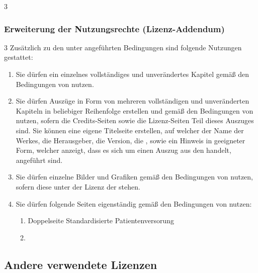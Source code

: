 \begin{WidePar}
\begin{multicols}{3}
\begin{description}
  
\end{description}
\end{multicols}
\subsubsection{Erweiterung der Nutzungsrechte
(Lizenz-Addendum)}
\label{topic:lizenz-addendum}
\begin{multicols}{3}
Zusätzlich zu den unter  angeführten
Bedingungen sind folgende Nutzungen gestattet: 

\begin{enumerate}
  \item Sie dürfen ein einzelnes vollständiges  und
  unverändertes Kapitel gemäß den Bedingungen von
   nutzen.
  \item Sie dürfen Auszüge in Form von mehreren
  vollständigen und unveränderten Kapiteln in beliebiger
  Reihenfolge erstellen und gemäß den Bedingungen von  nutzen, sofern die Credits-Seiten sowie die Lizenz-Seiten Teil dieses Auszuges sind. Sie können eine eigene Titelseite
    erstellen, auf welcher der Name der Werkes, die
    Herausgeber, die Version, die {\ARGE}, sowie ein Hinweis
    in geeigneter Form, welcher anzeigt, dass es sich um
    einen Auszug aus den {\AASS} handelt, angeführt sind.
    \item Sie dürfen einzelne Bilder und Grafiken gemäß den
    Bedingungen von  nutzen, sofern
    diese unter der Lizenz der {\AASS} stehen.
    \item Sie dürfen folgende Seiten eigenständig gemäß den
    Bedingungen von  nutzen:
    \begin{enumerate}
      \item Doppelseite Standardisierte Patientenversorung
      \item {}
    \end{enumerate}
\end{enumerate}
\end{multicols}
\end{WidePar}









\subsection{Andere verwendete Lizenzen}

